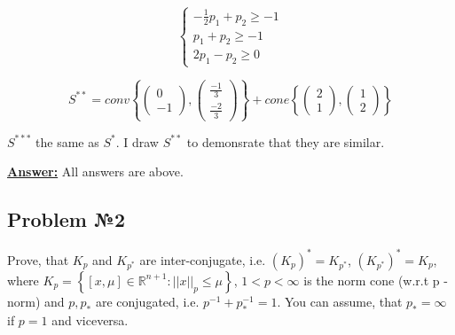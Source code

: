 \begin{equation*}
    \begin{cases}
        -\frac{1}{2}p_1 + p_2 \geq -1 \\
        p_1 + p_2 \geq -1 \\
        2p_1 - p_2 \geq 0
    \end{cases}
\end{equation*}

\begin{equation*}
    S^{**} = conv \left\{ 
        \begin{pmatrix} 0  \\ -1 \end{pmatrix}, 
        \begin{pmatrix} \frac{-1}{3} \\ \frac{-2}{3} \end{pmatrix} \right\} 
    + cone \left\{ 
        \begin{pmatrix} 2  \\ 1  \end{pmatrix}, 
    \begin{pmatrix} 1  \\ 2  \end{pmatrix} \right\}
\end{equation*}

\begin{center}
\end{center}

$S^{***}$ the same as $S^{*}$. I draw $S^{**}$ to demonsrate that they are similar.

\underline{\textbf{Answer:}} All answers are above.

\subsection{Problem №2}
Prove, that $K_p$ and $K_{p^*}$ are inter-conjugate, i.e. $(K_p)^* = K_{p^*}$, $(K_{p^*})^* = K_p$, where $K_p = \left\{ [x, \mu] \in \mathds{R}^{n+1} : ||x||_p \leq \mu \right\}$, $1 < p < \infty$ is the norm cone (w.r.t p - norm) and $p, p_{*}$ are conjugated, i.e. $p^{-1} + p_{*}^{-1} = 1$. You can assume, that $p_* = \infty$ if $p = 1$ and viceversa.

